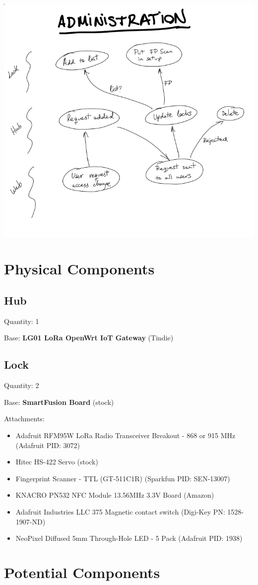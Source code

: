 \documentclass{article}
\begin{document}
\includegraphics[scale=0.4]{admin_graph.png}

\section{Physical Components}


\subsection{Hub}

\noindent
Quantity: 1

\noindent
Base: \textbf{LG01 LoRa OpenWrt IoT Gateway} (Tindie)

\subsection{Lock}

\noindent
Quantity: 2

\noindent
Base: \textbf{SmartFusion Board} (stock)

\noindent
Attachments:
\begin{itemize}
  \item Adafruit RFM95W LoRa Radio Transceiver Breakout - 868 or 915 MHz
    (Adafruit PID: 3072)
  \item Hitec HS-422 Servo (stock)
  \item Fingerprint Scanner - TTL (GT-511C1R) (Sparkfun PID: SEN-13007)
  \item KNACRO PN532 NFC Module 13.56MHz 3.3V Board (Amazon)
  \item Adafruit Industries LLC 375 Magnetic contact switch (Digi-Key PN: 1528-1907-ND)
  \item NeoPixel Diffused 5mm Through-Hole LED - 5 Pack (Adafruit PID: 1938)
\end{itemize}

\section{Potential Components}
  
\end{document}
